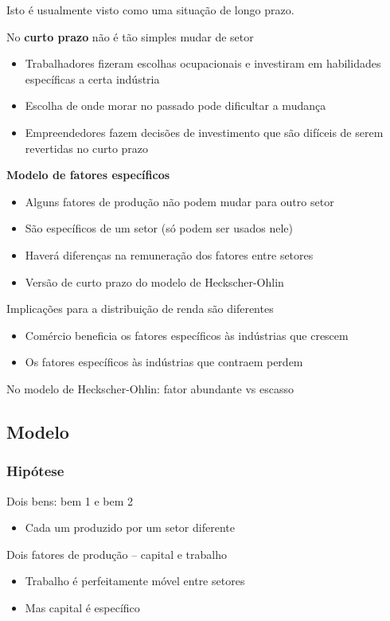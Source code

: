 \documentclass[a4paper,12pt]{article}[abntex2]
\begin{document}
Isto é usualmente visto como uma situação de longo prazo.

No \textbf{curto prazo} não é tão simples mudar de setor
\begin{itemize}
    \item Trabalhadores fizeram escolhas ocupacionais e investiram em habilidades específicas a certa indústria
    \item Escolha de onde morar no passado pode dificultar a mudança
    \item Empreendedores fazem decisões de investimento que são difíceis de serem revertidas no curto prazo
\end{itemize}

\textbf{Modelo de fatores específicos}
\begin{itemize}
    \item Alguns fatores de produção não podem mudar para outro setor
    \item São específicos de um setor (só podem ser usados nele)
    \item Haverá diferenças na remuneração dos fatores entre setores
    \item Versão de curto prazo do modelo de Heckscher-Ohlin
\end{itemize}

Implicações para a distribuição de renda são diferentes
\begin{itemize}
    \item Comércio beneficia os fatores específicos às indústrias que crescem
    \item Os fatores específicos às indústrias que contraem perdem
\end{itemize}

No modelo de Heckscher-Ohlin: fator abundante vs escasso

\subsection{\textbf{Modelo}}
\subsubsection{\textbf{Hipótese}}
Dois bens: bem 1 e bem 2
\begin{itemize}
    \item Cada um produzido por um setor diferente
\end{itemize}

Dois fatores de produção – capital e trabalho
\begin{itemize}
    \item Trabalho é perfeitamente móvel entre setores
    \item Mas capital é específico
\end{itemize}
\end{document}
